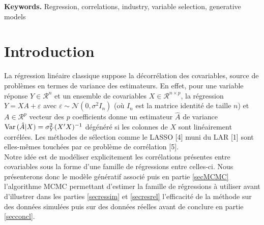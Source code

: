 \documentclass[12pt]{article}
\begin{document}
{\bf Keywords.} Regression, correlations, industry, variable selection, generative models


\section{Introduction}
	La régression linéaire classique suppose la décorrélation des covariables, source de problèmes en termes de variance des estimateurs. En effet, pour une variable réponse $Y \in \mathcal{R}^{n}$ et un ensemble de covariables $X \in \mathcal{R}^{n \times p}$, la régression $Y=XA+\varepsilon$ avec $ \varepsilon\sim \mathcal{N}(0,\sigma^2I_n)$ (où $I_n$ est la matrice identité de taille $n$) et $A\in \mathcal{R}^{p}$ vecteur des $p$ coefficients donne un estimateur $\hat A$ de variance $ {\rm Var}\,(\hat{A}|X)= \sigma^2_Y(X'X)^{-1}$ dégénéré si les colonnes de $X$ sont linéairement corrélées. Les méthodes de sélection comme le LASSO [4] muni du LAR [1] sont elles-mêmes touchées par ce problème de corrélation [5].
		\\
		
		Notre idée est de modéliser explicitement les corrélations présentes entre covariables sous la forme d'une famille de régressions entre celles-ci. Nous présenterons donc le modèle génératif associé puis en partie \ref{secMCMC} l'algorithme MCMC permettant d'estimer la famille de régressions à utiliser avant d'illustrer dans les parties \ref{secressim} et \ref{secresrel} l'efficacité de la méthode sur des données simulées puis sur des données réelles avant de conclure en partie \ref{secconcl}.
		
\end{document}

